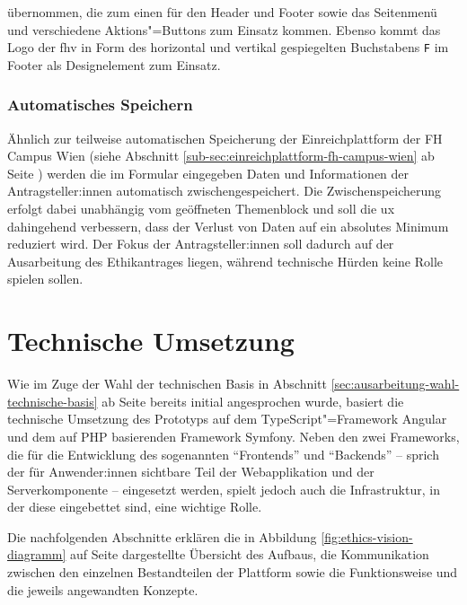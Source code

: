 \documentclass[a4paper,12pt,twoside]{scrreprt}
\begin{document}
\noindent übernommen, die zum einen für den Header und Footer sowie das Seitenmenü und verschiedene Aktions"=Buttons zum Einsatz kommen. Ebenso kommt das Logo der \ac{fhv} in Form des horizontal und vertikal gespiegelten Buchstabens \texttt{F} im Footer als Designelement zum Einsatz.

\subsubsection*{Automatisches Speichern}
 \label{sub-sub-sec:automatsiches-speichern}

 Ähnlich zur teilweise automatischen Speicherung der Einreichplattform der FH Campus Wien (siehe Abschnitt \ref{sub-sec:einreichplattform-fh-campus-wien} ab Seite \pageref{sub-sec:einreichplattform-fh-campus-wien}) werden die im Formular eingegeben Daten und Informationen der Antragsteller:innen automatisch zwischengespeichert. Die Zwischenspeicherung erfolgt dabei unabhängig vom geöffneten Themenblock und soll die \ac{ux} dahingehend verbessern, dass der Verlust von Daten auf ein absolutes Minimum reduziert wird. Der Fokus der Antragsteller:innen soll dadurch auf der Ausarbeitung des Ethikantrages liegen, während technische Hürden keine Rolle spielen sollen.

\section{Technische Umsetzung}
\label{sec:ausarbeitung-technische-umsetzung}

Wie im Zuge der Wahl der technischen Basis in Abschnitt \ref{sec:ausarbeitung-wahl-technische-basis} ab Seite \pageref{sec:ausarbeitung-wahl-technische-basis} bereits initial angesprochen wurde, basiert die technische Umsetzung des Prototyps auf dem TypeScript"=Framework Angular und dem auf PHP basierenden Framework Symfony. Neben den zwei Frameworks, die für die Entwicklung des sogenannten \enquote{Frontends} und \enquote{Backends} -- sprich der für Anwender:innen sichtbare Teil der Webapplikation und der Serverkomponente -- eingesetzt werden, spielt jedoch auch die Infrastruktur, in der diese eingebettet sind, eine wichtige Rolle.

Die nachfolgenden Abschnitte erklären die in Abbildung \ref{fig:ethics-vision-diagramm} auf Seite \pageref{fig:ethics-vision-diagramm} dargestellte Übersicht des Aufbaus, die Kommunikation zwischen den einzelnen Bestandteilen der Plattform sowie die Funktionsweise und die jeweils angewandten Konzepte.
\end{document}
